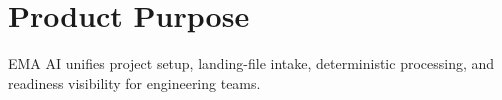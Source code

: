 \section{Product Purpose}
EMA AI unifies project setup, landing-file intake, deterministic processing, and readiness visibility for engineering teams.

